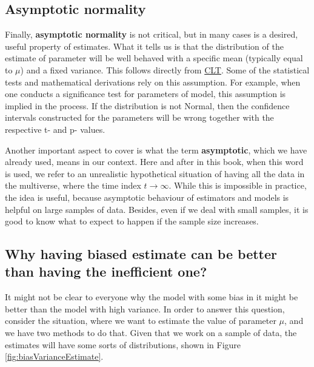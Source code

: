\documentclass[
]{book}
\theoremstyle{definition}
\theoremstyle{definition}
\theoremstyle{definition}
\theoremstyle{definition}
\theoremstyle{remark}
\begin{document}
\hypertarget{asymptoticNormality}{%
\subsection{Asymptotic normality}\label{asymptoticNormality}}

Finally, \textbf{asymptotic normality} is not critical, but in many cases is a desired, useful property of estimates. What it tells us is that the distribution of the estimate of parameter will be well behaved with a specific mean (typically equal to \(\mu\)) and a fixed variance. This follows directly from \protect\hyperlink{LLNandCLT}{CLT}. Some of the statistical tests and mathematical derivations rely on this assumption. For example, when one conducts a significance test for parameters of model, this assumption is implied in the process. If the distribution is not Normal, then the confidence intervals constructed for the parameters will be wrong together with the respective t- and p- values.

Another important aspect to cover is what the term \textbf{asymptotic}, which we have already used, means in our context. Here and after in this book, when this word is used, we refer to an unrealistic hypothetical situation of having all the data in the multiverse, where the time index \(t \rightarrow \infty\). While this is impossible in practice, the idea is useful, because asymptotic behaviour of estimators and models is helpful on large samples of data. Besides, even if we deal with small samples, it is good to know what to expect to happen if the sample size increases.

\hypertarget{efficiencyVSBias}{%
\subsection{Why having biased estimate can be better than having the inefficient one?}\label{efficiencyVSBias}}

It might not be clear to everyone why the model with some bias in it might be better than the model with high variance. In order to answer this question, consider the situation, where we want to estimate the value of parameter \(\mu\), and we have two methods to do that. Given that we work on a sample of data, the estimates will have some sorts of distributions, shown in Figure \ref{fig:biasVarianceEstimate}.
\end{document}
